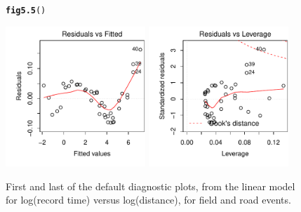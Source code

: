 \documentclass[12pt, a4paper,  BCOR=8.25mm, DIV=15]{scrartcl}\usepackage[]{graphicx}\usepackage[]{color}
\makeatletter
\newcommand{\hlstd}[1]{\textcolor[rgb]{0.345,0.345,0.345}{#1}}%
\newcommand{\hlkwd}[1]{\textcolor[rgb]{0.737,0.353,0.396}{\textbf{#1}}}%
\newenvironment{kframe}{%
 \def\at@end@of@kframe{}%
 \ifinner\ifhmode%
  \def\at@end@of@kframe{\end{minipage}}%
  \begin{minipage}{\columnwidth}%
 \fi\fi%
 \def\FrameCommand##1{\hskip\@totalleftmargin \hskip-\fboxsep
 \colorbox{shadecolor}{##1}\hskip-\fboxsep
     \hskip-\linewidth \hskip-\@totalleftmargin \hskip\columnwidth}%
 \MakeFramed {\advance\hsize-\width
   \@totalleftmargin\z@ \linewidth\hsize
   \@setminipage}}%
 {\par\unskip\endMakeFramed%
 \at@end@of@kframe}
\newenvironment{knitrout}{}{} %
\makeatother
\begin{document}
\begin{figure}
\begin{knitrout}
\color{fgcolor}\begin{kframe}
\begin{alltt}
\hlkwd{fig5.5}\hlstd{()}
\end{alltt}
\end{kframe}

{\centering \includegraphics[width=0.47\textwidth]{figs/glm-fig5_5e-1} 
\includegraphics[width=0.47\textwidth]{figs/glm-fig5_5e-2} 

}



\end{knitrout}
      \caption{First and last of the default diagnostic plots, from the
        linear model for log(record time) versus log(distance), for
        field and road events.}
\label{fig:wr-diag}
\end{figure}
\end{document}
